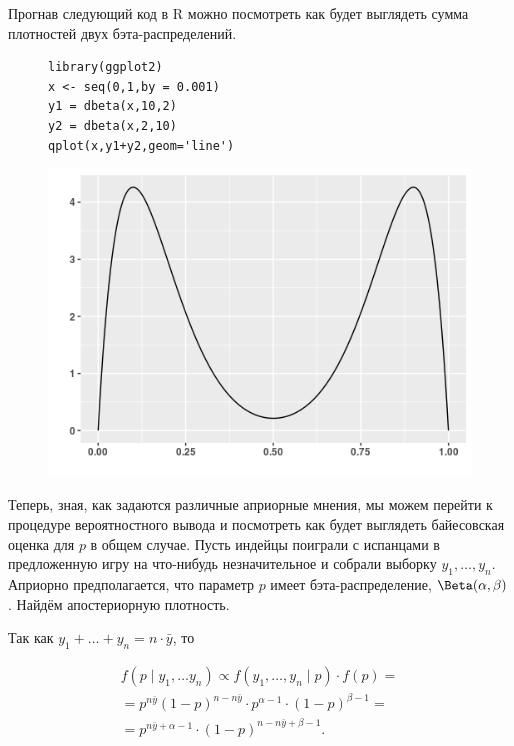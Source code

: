 \documentclass[12pt, a4paper, oneside]{extreport}
\def \b{\beta}
\theoremstyle{plain}              %
\theoremstyle{definition}         %
\begin{document}
Прогнав следующий код в R можно посмотреть как будет выглядеть сумма плотностей двух бэта-распределений. 

\begin{figure}[H]
\begin{minipage}{0.19\linewidth}
\end{minipage}
\hfill
\begin{minipage}{0.29\linewidth}
\begin{verbatim}
library(ggplot2)
x <- seq(0,1,by = 0.001)
y1 = dbeta(x,10,2)
y2 = dbeta(x,2,10)
qplot(x,y1+y2,geom='line')
\end{verbatim}
\end{minipage}
\hfill
\begin{minipage}[H]{0.49\linewidth}
\includegraphics[scale=0.5]{beta_and_beta.png}
\end{minipage}
\end{figure}

Теперь, зная, как задаются различные априорные мнения, мы можем перейти к процедуре вероятностного вывода и посмотреть как будет выглядеть байесовская оценка для $p$ в общем случае. Пусть индейцы поиграли с испанцами в предложенную игру на что-нибудь незначительное и собрали выборку $y_1, \ldots, y_n$.  Априорно предполагается, что параметр $p$ имеет бэта-распределение, $\Beta(\alpha,\beta)$. Найдём апостериорную плотность. 

Так как  $y_1 + \ldots + y_n = n \cdot \bar{y} $, то

\begin{multline*}
f(p \mid y_1 , \ldots y_n) \propto f(y_1, \ldots, y_n \mid p) \cdot f(p) = \\ =   p^{n \bar y}(1-p)^{n-n \bar y} \cdot p^{\alpha - 1} \cdot (1-p)^{\b - 1}   = \\ =  p^{n \bar y + \alpha - 1} \cdot (1-p)^{n - n\bar y + \b - 1}. 
\end{multline*}
\end{document}
